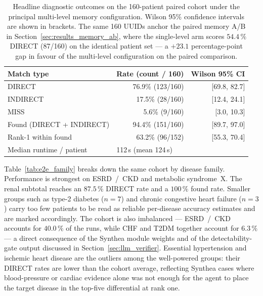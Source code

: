 \begin{table}[!htbp]
\centering
\caption{Headline diagnostic outcomes on the 160-patient paired cohort
under the principal multi-level memory configuration. Wilson 95\%
confidence intervals are shown in brackets. The same 160 UUIDs anchor
the paired memory A/B in Section~\ref{sec:results_memory_ab}, where
the single-level arm scores $54.4\,\%$ DIRECT (87/160) on the
identical patient set --- a $+23.1$ percentage-point gap in favour of
the multi-level configuration on the paired comparison.}
\label{tab:e2e_headline}
\small
\begin{tabular}{@{}lrr@{}}
\toprule
\textbf{Match type}        & \textbf{Rate (count / 160)} & \textbf{Wilson 95\% CI} \\
\midrule
DIRECT                     & 76.9\% (123/160) & [69.8, 82.7] \\
INDIRECT                   & 17.5\% (28/160)  & [12.4, 24.1] \\
MISS                       &  5.6\% (9/160)   & [3.0, 10.3]  \\
\midrule
Found (DIRECT + INDIRECT)  & 94.4\% (151/160) & [89.7, 97.0] \\
Rank-1 within found        & 63.2\% (96/152)  & [55.3, 70.4] \\
\midrule
Median runtime / patient   & \multicolumn{2}{l}{112\,s (mean 124\,s)} \\
\bottomrule
\end{tabular}
\end{table}

Table~\ref{tab:e2e_family} breaks down the same cohort by disease
family. Performance is strongest on ESRD~/~CKD and metabolic
syndrome~X. The renal subtotal reaches an $87.5\,\%$ DIRECT rate and
a $100\,\%$ found rate. Smaller groups such as type-2 diabetes
($n=7$) and chronic congestive heart failure ($n=3$) carry too few
patients to be read as reliable per-disease accuracy estimates and
are marked accordingly. The cohort is also imbalanced --- ESRD~/~CKD
accounts for $40.0\,\%$ of the runs, while CHF and T2DM together
account for $6.3\,\%$ --- a direct consequence of the Synthea module
weights and of the detectability-gate output discussed in
Section~\ref{sec:llm_verifier}. Essential hypertension and ischemic
heart disease are the outliers among the well-powered groups: their
DIRECT rates are lower than the cohort average, reflecting Synthea
cases where blood-pressure or cardiac evidence alone was not enough
for the agent to place the target disease in the top-five differential
at rank one.

